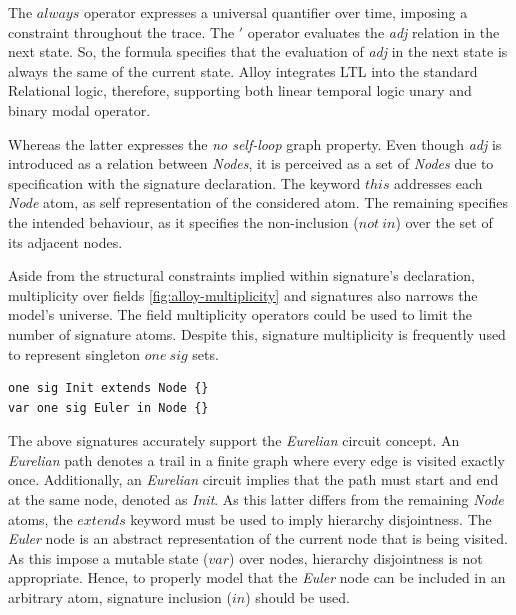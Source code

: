 The $always$ operator expresses a universal quantifier over time, imposing a constraint throughout the trace. The $'$ operator evaluates the \textit{adj} relation in the next state. So, the formula specifies that the evaluation of \textit{adj} in the next state is always the same of the current state. Alloy integrates LTL into the standard Relational logic, therefore, supporting both linear temporal logic unary and binary modal operator.

Whereas the latter expresses the \textit{no self-loop} graph property. Even though \textit{adj} is introduced as a relation between \textit{Nodes}, it is perceived as a set of \textit{Nodes} due to specification with the signature declaration. The keyword $this$ addresses each \textit{Node} atom, as self representation of the considered atom. The remaining specifies the intended behaviour, as it specifies the non-inclusion ($not\ in$) over the set of its adjacent nodes.


Aside from the structural constraints implied within signature's declaration, multiplicity over fields \ref{fig:alloy-multiplicity} and signatures also narrows the model's universe. The field multiplicity operators could be used to limit the number of signature atoms. Despite this, signature multiplicity is frequently used to represent singleton $one\ sig$ sets.

\begin{lstlisting}[title={\textit{Node} signature hierarchy.}, otherkeywords = {one, abstract, sig, module, var, set, fact, extends, no, in}, floatplacement=H]
one sig Init extends Node {}
var one sig Euler in Node {}
\end{lstlisting}

The above signatures accurately support the \textit{Eurelian} circuit concept. An \textit{Eurelian} path denotes a trail in a finite graph where every edge is visited exactly once. Additionally, an \textit{Eurelian} circuit implies that the path must start and end at the same node, denoted as \textit{Init}. As this latter differs from the remaining \textit{Node} atoms, the $extends$ keyword must be used to imply hierarchy disjointness. The \textit{Euler} node is an abstract representation of the current node that is being visited. As this impose a mutable state ($var$) over nodes, hierarchy disjointness is not appropriate. Hence, to properly model that the \textit{Euler} node can be included in an arbitrary atom, signature inclusion ($in$) should be used.

